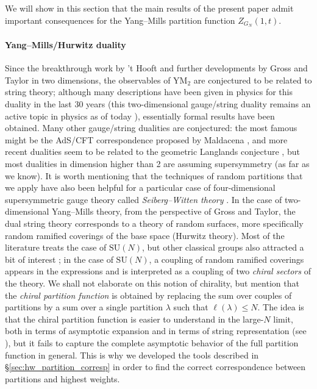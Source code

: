 \documentclass[11pt,a4paper,reqno]{article}
\theoremstyle{definition}
\theoremstyle{remark}
\newcommand\SU{{\mathrm{SU}}}
\newcommand\YM{\mathrm{YM}}
\begin{document}
We will show in this section that the main results of the present paper admit important consequences for the Yang--Mills partition function $Z_{G_N}(1,t)$.

\paragraph{Yang--Mills/Hurwitz duality}

Since the breakthrough work by 't Hooft \cite{Hoo74} and further developments by Gross and Taylor \cite{Gro,GT,GT2} in two dimensions, the observables of $\YM_2$ are conjectured to be related to string theory; although many descriptions have been given in physics for this duality in the last 30 years (this two-dimensional gauge/string duality remains an active topic in physics as of today \cite{PS,AKS,BenTro}), essentially formal results have been obtained. Many other gauge/string dualities are conjectured: the most famous might be the AdS/CFT correspondence proposed by Maldacena \cite{Mal}, and more recent dualities seem to be related to the geometric Langlands conjecture \cite{KW}, but most dualities in dimension higher than 2 are assuming supersymmetry (as far as we know). It is worth mentioning that the techniques of random partitions that we apply have also been helpful for a particular case of four-dimensional supersymmetric gauge theory called \emph{Seiberg--Witten theory} \cite{NO}. In the case of two-dimensional Yang--Mills theory, from the perspective of Gross and Taylor, the dual string theory corresponds to a theory of random surfaces, more specifically random ramified coverings of the base space (Hurwitz theory). Most of the literature treats the case of $\SU(N)$, but other classical groups also attracted a bit of interest \cite{Ram2}; in the case of $\SU(N)$, a coupling of random ramified coverings appears in the expressions and is interpreted as a coupling of two \emph{chiral sectors} of the theory. We shall not elaborate on this notion of chirality, but mention that the \emph{chiral partition function} is obtained by replacing the sum over couples of partitions by a sum over a single partition $\lambda$ such that $\ell(\lambda)\leq N$. The idea is that the chiral partition function is easier to understand in the large-$N$ limit, both in terms of asymptotic expansion and in terms of string representation (see \cite{Nov2024}), but it fails to capture the complete asymptotic behavior of the full partition function in general. This is why we developed the tools described in \S\ref{sec:hw_partition_corresp} in order to find the correct correspondence between partitions and highest weights.
\end{document}

